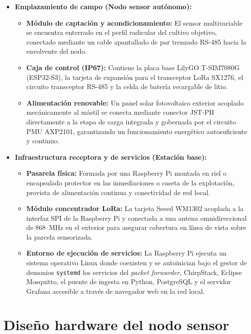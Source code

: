 \begin{itemize}
    \item \textbf{Emplazamiento de campo (Nodo sensor autónomo):}
    \begin{itemize}
        \item \textbf{Módulo de captación y acondicionamiento:} El sensor multivariable se encuentra enterrado en el perfil radicular del cultivo objetivo, conectado mediante un cable apantallado de par trenzado RS-485 hacia la envolvente del nodo.
        \item \textbf{Caja de control (IP67):} Contiene la placa base LilyGO T-SIM7080G (ESP32-S3), la tarjeta de expansión para el transceptor LoRa SX1276, el circuito transceptor RS-485 y la celda de batería recargable de litio.
        \item \textbf{Alimentación renovable:} Un panel solar fotovoltaico exterior acoplado mecánicamente al mástil se conecta mediante conector JST-PH directamente a la etapa de carga integrada y gobernada por el circuito PMU AXP2101, garantizando un funcionamiento energético autosuficiente y continuo.
    \end{itemize}

    \item \textbf{Infraestructura receptora y de servicios (Estación base):}
    \begin{itemize}
        \item \textbf{Pasarela física:} Formada por una Raspberry Pi montada en riel o encapsulado protector en las inmediaciones o caseta de la explotación, provista de alimentación continua y conectividad de red local.
        \item \textbf{Módulo concentrador LoRa:} La tarjeta Seeed WM1302 acoplada a la interfaz SPI de la Raspberry Pi y conectada a una antena omnidireccional de 868~MHz en el exterior para asegurar cobertura en línea de vista sobre la parcela sensorizada.
        \item \textbf{Entorno de ejecución de servicios:} La Raspberry Pi ejecuta un sistema operativo Linux donde coexisten y se autoinician bajo el gestor de demonios \texttt{systemd} los servicios del \textit{packet forwarder}, ChirpStack, Eclipse Mosquitto, el puente de ingesta en Python, PostgreSQL y el servidor Grafana accesible a través de navegador web en la red local.
    \end{itemize}
\end{itemize}

\section{Diseño hardware del nodo sensor}

